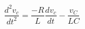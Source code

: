 \documentclass[preview]{standalone}
\begin{document}
\begin{center}
\[\frac{d^2v_c}{dt^2} = \frac{-R}{L} \frac{dv_c}{dt} - \frac{v_C}{LC}\]
\end{center}
\end{document}
